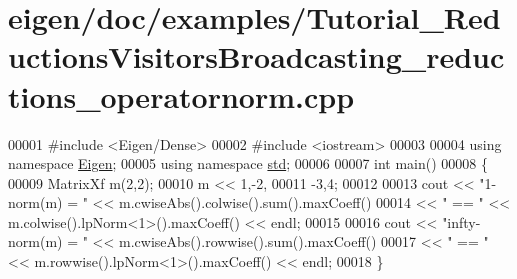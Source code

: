 \hypertarget{eigen_2doc_2examples_2_tutorial___reductions_visitors_broadcasting__reductions__operatornorm_8cpp_source}{}\section{eigen/doc/examples/\+Tutorial\+\_\+\+Reductions\+Visitors\+Broadcasting\+\_\+reductions\+\_\+operatornorm.cpp}
\label{eigen_2doc_2examples_2_tutorial___reductions_visitors_broadcasting__reductions__operatornorm_8cpp_source}

\begin{DoxyCode}
00001 \textcolor{preprocessor}{#include <Eigen/Dense>}
00002 \textcolor{preprocessor}{#include <iostream>}
00003 
00004 \textcolor{keyword}{using namespace }\hyperlink{namespace_eigen}{Eigen};
00005 \textcolor{keyword}{using namespace }\hyperlink{namespacestd}{std};
00006 
00007 \textcolor{keywordtype}{int} main()
00008 \{
00009   MatrixXf m(2,2);
00010   m << 1,-2,
00011        -3,4;
00012 
00013   cout << \textcolor{stringliteral}{"1-norm(m)     = "} << m.cwiseAbs().colwise().sum().maxCoeff()
00014        << \textcolor{stringliteral}{" == "}             << m.colwise().lpNorm<1>().maxCoeff() << endl;
00015 
00016   cout << \textcolor{stringliteral}{"infty-norm(m) = "} << m.cwiseAbs().rowwise().sum().maxCoeff()
00017        << \textcolor{stringliteral}{" == "}             << m.rowwise().lpNorm<1>().maxCoeff() << endl;
00018 \}
\end{DoxyCode}
